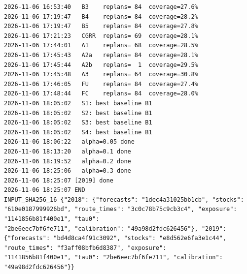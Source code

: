 \documentclass[10pt]{article}
\begin{document}
\begin{verbatim}
2026-11-06 16:53:40   B3    replans= 84  coverage=27.6%
2026-11-06 17:19:47   B4    replans= 84  coverage=28.2%
2026-11-06 17:19:47   B5    replans= 84  coverage=27.8%
2026-11-06 17:21:23   CGRR  replans= 69  coverage=28.1%
2026-11-06 17:44:01   A1    replans= 68  coverage=28.5%
2026-11-06 17:45:43   A2a   replans= 84  coverage=28.1%
2026-11-06 17:45:44   A2b   replans=  1  coverage=29.5%
2026-11-06 17:45:48   A3    replans= 64  coverage=30.8%
2026-11-06 17:46:05   FU    replans= 84  coverage=27.4%
2026-11-06 17:48:44   FC    replans= 84  coverage=28.0%
2026-11-06 18:05:02   S1: best baseline B1
2026-11-06 18:05:02   S2: best baseline B1
2026-11-06 18:05:02   S3: best baseline B1
2026-11-06 18:05:02   S4: best baseline B1
2026-11-06 18:06:22   alpha=0.05 done
2026-11-06 18:13:20   alpha=0.1 done
2026-11-06 18:19:52   alpha=0.2 done
2026-11-06 18:25:06   alpha=0.3 done
2026-11-06 18:25:07 [2019] done
2026-11-06 18:25:07 END
INPUT_SHA256_16 {"2018": {"forecasts": "1dec4a31025bb1cb", "stocks": "610e0187999926bd", "route_times": "3c0c78b75c9cb3c4", "exposure": "1141856b81f400e1", "tau0":
"2be6eec7bf6fe711", "calibration": "49a98d2fdc626456"}, "2019": {"forecasts": "bd4d8ca4f91c3092", "stocks": "e8d562e6fa3e1c44", "route_times": "f3aff08bfb6d8387", "exposure":
"1141856b81f400e1", "tau0": "2be6eec7bf6fe711", "calibration": "49a98d2fdc626456"}}
\end{verbatim}
\end{document}
